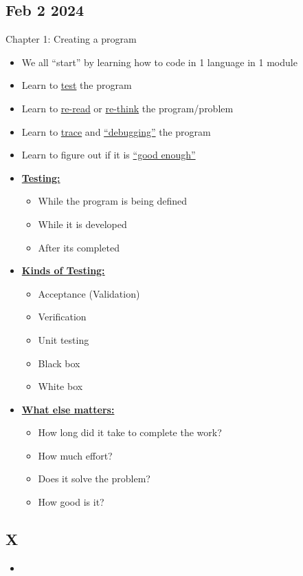 \documentclass[12pt]{article}
\begin{document}
\subsection{Feb 2 2024}

Chapter 1: Creating a program

\begin{itemize}
		  \item We all ``start'' by learning how to code in 1 language in 1 module
		  \item Learn to \underline{test} the program
		  \item Learn to \underline{re-read} or \underline{re-think} the program/problem
		  \item Learn to \underline{trace} and  \underline{``debugging''} the program
		  \item Learn to figure out if it is \underline{``good enough''}
		  \item \textbf{\underline{Testing:}}
					 \begin{itemize}
								\item While the program is being defined
								\item While it is developed
								\item After its completed
					 \end{itemize}
		  \item \textbf{\underline{Kinds of Testing:}}
					 \begin{itemize}
								\item Acceptance (Validation) 
								\item Verification
								\item Unit testing
								\item Black box
								\item White box
					 \end{itemize}
		  \item \textbf{\underline{What else matters:}}
					 \begin{itemize}
								\item How long did it take to complete the work? 
								\item How much effort?
								\item Does it solve the problem?
								\item How good is it?
					 \end{itemize}
\end{itemize}

\subsection{X}

\begin{itemize}
		  \item 
\end{itemize}
\end{document}
